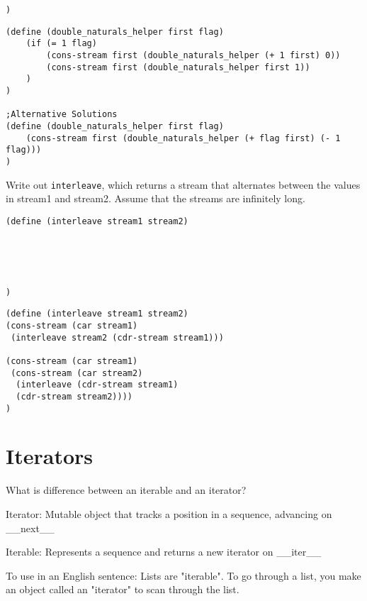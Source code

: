 \documentclass{exam}
\begin{document}
\begin{questions}
\begin{blocksection}
\begin{lstlisting}
)
\end{lstlisting}

\begin{solution}[1in]
\begin{lstlisting}
(define (double_naturals_helper first flag)
    (if (= 1 flag)
        (cons-stream first (double_naturals_helper (+ 1 first) 0))
        (cons-stream first (double_naturals_helper first 1))
    )
)

;Alternative Solutions
(define (double_naturals_helper first flag)
    (cons-stream first (double_naturals_helper (+ flag first) (- 1 flag)))
)
\end{lstlisting}
\end{solution}

\question Write out \texttt{interleave}, which returns a stream that alternates between the values in stream1 and stream2. Assume that the streams are infinitely long.
\begin{lstlisting}
(define (interleave stream1 stream2)





)
\end{lstlisting}

\begin{solution}[1in]
\begin{lstlisting}
(define (interleave stream1 stream2)
(cons-stream (car stream1) 
 (interleave stream2 (cdr-stream stream1)))

(cons-stream (car stream1)
 (cons-stream (car stream2)
  (interleave (cdr-stream stream1)
  (cdr-stream stream2))))
)
\end{lstlisting}
\end{solution}
\end{blocksection}

\section{Iterators}
\begin{blocksection}
\question What is difference between an iterable and an iterator?
\begin{solution}[0.25in]
Iterator: Mutable object that tracks a position in a sequence, advancing on __next__ 

Iterable: Represents a sequence and returns a new iterator on __iter__

To use in an English sentence:
Lists are "iterable". To go through a list, you make an object called an "iterator" to scan through the list.
\end{solution}
\end{blocksection}


\end{questions}
\end{document}
